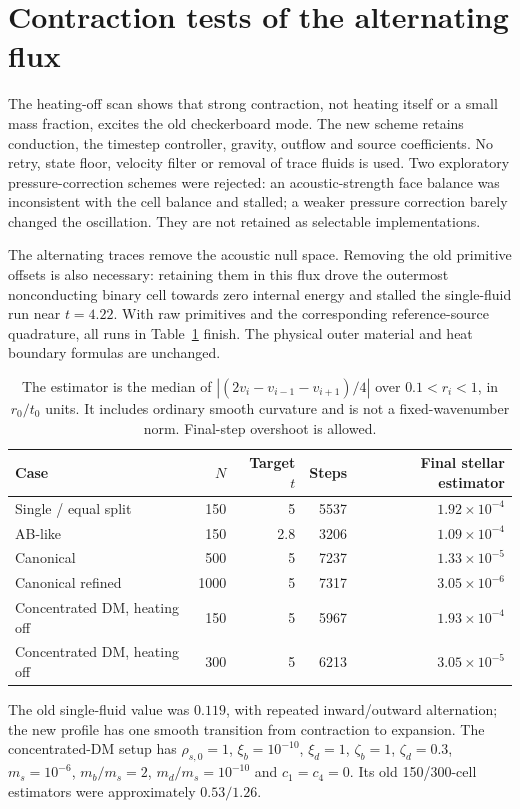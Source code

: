 \documentclass[11pt]{article}
\begin{document}
\section{Contraction tests of the alternating flux}
The heating-off scan shows that strong contraction, not heating itself
or a small mass fraction, excites the old checkerboard mode. The new scheme
retains conduction, the timestep controller, gravity, outflow and source
coefficients. No retry, state floor, velocity filter or removal of trace
fluids is used. Two exploratory pressure-correction schemes were rejected:
an acoustic-strength face balance was inconsistent with the cell balance
and stalled; a weaker pressure correction barely changed the oscillation.
They are not retained as selectable implementations.

The alternating traces remove the acoustic null space. Removing the old
primitive offsets is also necessary: retaining them in this flux drove the
outermost nonconducting binary cell towards zero internal energy and stalled
the single-fluid run near $t=4.22$. With raw primitives and the corresponding
reference-source quadrature, all runs in Table~\ref{tab:oscillation} finish.
The physical outer material and heat boundary formulas are unchanged.

\begin{table}[ht]
\centering
\begin{tabular}{lrrrr}
\toprule
Case & $N$ & Target $t$ & Steps & Final stellar estimator\\
\midrule
Single / equal split &150&5&5537&$1.92\times10^{-4}$\\
AB-like &150&2.8&3206&$1.09\times10^{-4}$\\
Canonical &500&5&7237&$1.33\times10^{-5}$\\
Canonical refined &1000&5&7317&$3.05\times10^{-6}$\\
Concentrated DM, heating off &150&5&5967&$1.93\times10^{-4}$\\
Concentrated DM, heating off &300&5&6213&$3.05\times10^{-5}$\\
\bottomrule
\end{tabular}
\caption{The estimator is the median of
$|(2v_i-v_{i-1}-v_{i+1})/4|$ over $0.1<r_i<1$, in $r_0/t_0$ units.
It includes ordinary smooth curvature and is not a fixed-wavenumber norm.
Final-step overshoot is allowed.}\label{tab:oscillation}
\end{table}
The old single-fluid value was $0.119$, with repeated inward/outward
alternation; the new profile has one smooth transition from contraction
to expansion. The concentrated-DM setup has $\rho_{s,0}=1$,
$\xi_b=10^{-10}$, $\xi_d=1$, $\zeta_b=1$, $\zeta_d=0.3$,
$m_s=10^{-6}$, $m_b/m_s=2$, $m_d/m_s=10^{-10}$ and $c_1=c_4=0$.
Its old 150/300-cell estimators were approximately $0.53/1.26$.
\end{document}
